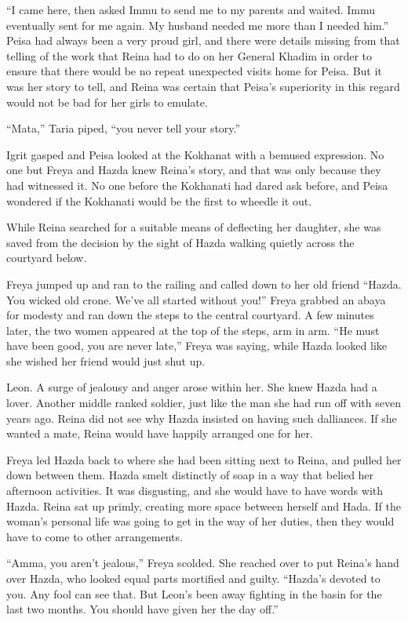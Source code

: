 \documentclass{article}
\begin{document}
	“I came here, then asked Immu to send me to my parents and waited. Immu eventually sent for me again. My husband needed me more than I needed him.” Peisa had always been a very proud girl, and there were details missing from that telling of the work that Reina had to do on her General Khadim in order to ensure that there would be no repeat unexpected visits home for Peisa. But it was her story to tell, and Reina was certain that Peisa’s superiority in this regard would not be bad for her girls to emulate. 
	
	“Mata,” Taria piped, “you never tell your story.” 
	
	Igrit gasped and Peisa looked at the Kokhanat with a bemused expression. No one but Freya and Hazda knew Reina’s story, and that was only because they had witnessed it. No one before the Kokhanati had dared ask before, and Peisa wondered  if the Kokhanati would be the first to wheedle it out. 
	
	While Reina searched for a suitable means of deflecting her daughter, she was saved from the decision by the sight of Hazda walking quietly across the courtyard below.
	
	Freya jumped up and ran to the railing and called down to her old friend “Hazda. You wicked old crone. We’ve all started without you!” Freya grabbed an abaya for modesty and ran down the steps to the central courtyard. A few minutes later, the two women appeared at the top of the steps, arm in arm. “He must have been good, you are never late,” Freya was saying, while Hazda looked like she wished her friend would just shut up.
	
	Leon. A surge of jealousy and anger arose within her. She knew Hazda had a lover. Another middle ranked soldier, just like the man she had run off with seven years ago. Reina did not see why Hazda insisted on having such dalliances. If she wanted a mate, Reina would have happily arranged one for her. 
	
	Freya led Hazda back to where she had been sitting next to Reina, and pulled her down between them. Hazda smelt distinctly of soap in a way that belied her afternoon activities. It was disgusting, and she would have to have words with Hazda. Reina sat up primly, creating more space between herself and Hada. If the woman’s personal life was going to get in the way of her duties, then they would have to come to other arrangements. 
	
	“Amma, you aren’t jealous,” Freya scolded. She reached over to put Reina’s hand over Hazda, who looked equal parts mortified and guilty. “Hazda’s devoted to you. Any fool can see that. But Leon’s been away fighting in the basin for the last two months. You should have given her the day off.” 
	
\end{document}
